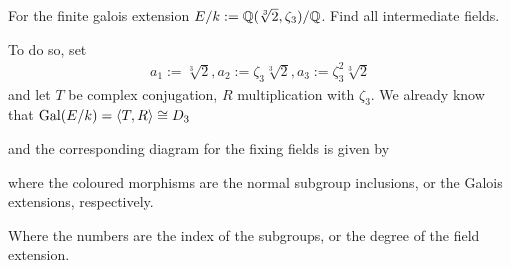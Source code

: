 \begin{ex}[]
  For the finite galois extension $E/k :=\mathbb{Q}(\sqrt[3]{2},\zeta_3)/\mathbb{Q}$. Find all intermediate fields.

  To do so, set
  \begin{align*}
    a_1 := \sqrt[3]{2}, a_2 := \zeta_3 \sqrt[3]{2}, a_3 := \zeta_3^{2} \sqrt[3]{2}
  \end{align*}
  and let $T$ be complex conjugation, $R$ multiplication with $\zeta_3$.
  We already know that
  $\operatorname{Gal}(E/k) = \langle T,R\rangle \cong D_3$

  \begin{center}
  \end{center}
  and the corresponding diagram for the fixing fields is given by
  \begin{center}
  \end{center}
  where the coloured morphisms are the normal subgroup inclusions, or the Galois extensions, respectively.

  Where the numbers are the index of the subgroups, or the degree of the field extension.
\end{ex}




